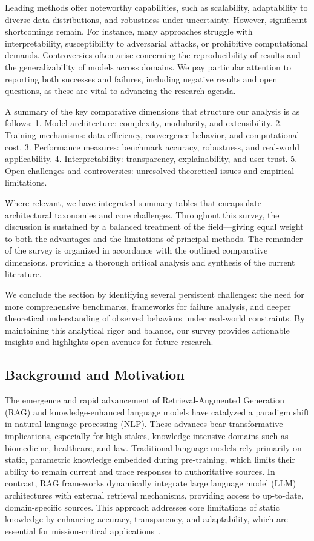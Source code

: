 \documentclass[sigconf]{acmart}
\begin{document}
Leading methods offer noteworthy capabilities, such as scalability, adaptability to diverse data distributions, and robustness under uncertainty. However, significant shortcomings remain. For instance, many approaches struggle with interpretability, susceptibility to adversarial attacks, or prohibitive computational demands. Controversies often arise concerning the reproducibility of results and the generalizability of models across domains. We pay particular attention to reporting both successes and failures, including negative results and open questions, as these are vital to advancing the research agenda.

A summary of the key comparative dimensions that structure our analysis is as follows:
1. Model architecture: complexity, modularity, and extensibility.
2. Training mechanisms: data efficiency, convergence behavior, and computational cost.
3. Performance measures: benchmark accuracy, robustness, and real-world applicability.
4. Interpretability: transparency, explainability, and user trust.
5. Open challenges and controversies: unresolved theoretical issues and empirical limitations.

Where relevant, we have integrated summary tables that encapsulate architectural taxonomies and core challenges. Throughout this survey, the discussion is sustained by a balanced treatment of the field—giving equal weight to both the advantages and the limitations of principal methods. The remainder of the survey is organized in accordance with the outlined comparative dimensions, providing a thorough critical analysis and synthesis of the current literature.

We conclude the section by identifying several persistent challenges: the need for more comprehensive benchmarks, frameworks for failure analysis, and deeper theoretical understanding of observed behaviors under real-world constraints. By maintaining this analytical rigor and balance, our survey provides actionable insights and highlights open avenues for future research.

\subsection{Background and Motivation}

The emergence and rapid advancement of Retrieval-Augmented Generation (RAG) and knowledge-enhanced language models have catalyzed a paradigm shift in natural language processing (NLP). These advances bear transformative implications, especially for high-stakes, knowledge-intensive domains such as biomedicine, healthcare, and law. Traditional language models rely primarily on static, parametric knowledge embedded during pre-training, which limits their ability to remain current and trace responses to authoritative sources. In contrast, RAG frameworks dynamically integrate large language model (LLM) architectures with external retrieval mechanisms, providing access to up-to-date, domain-specific sources. This approach addresses core limitations of static knowledge by enhancing accuracy, transparency, and adaptability, which are essential for mission-critical applications~\cite{ref4,ref5,ref10,ref14,ref15,ref16,ref17,ref46,ref47,ref48,ref51,ref52,ref54,ref55,ref64}.
\end{document}
